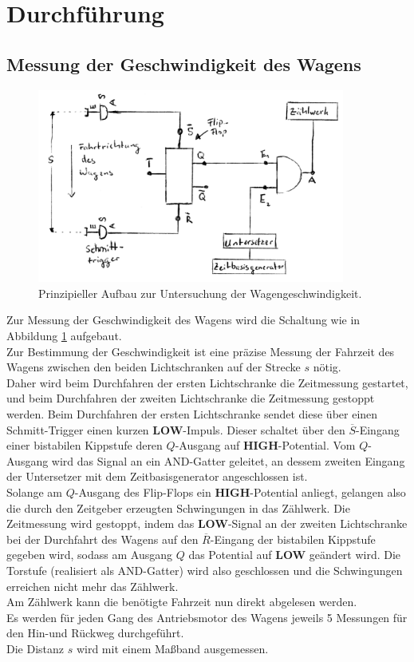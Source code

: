 \section{Durchführung}
\FloatBarrier
\label{sec:Durchführung}
\subsection{Messung der Geschwindigkeit des Wagens}
\label{sec:speedygonzales}
\begin{figure}
	\includegraphics[width=0.9\textwidth]{Bilder/geschwindigkeit_schaltung.png}
	\caption{Prinzipieller Aufbau zur Untersuchung der Wagengeschwindigkeit.}
	\label{fig:wagen} %
\end{figure}
Zur Messung der Geschwindigkeit des Wagens wird die Schaltung wie in Abbildung \ref{fig:wagen} aufgebaut.\\
Zur Bestimmung der Geschwindigkeit ist eine präzise Messung der Fahrzeit des Wagens zwischen den beiden Lichtschranken auf der Strecke $s$ nötig.\\
Daher wird beim Durchfahren der ersten Lichtschranke die Zeitmessung gestartet, und beim Durchfahren der zweiten Lichtschranke die Zeitmessung gestoppt werden.
Beim Durchfahren der ersten Lichtschranke sendet diese über einen Schmitt-Trigger einen kurzen \textbf{LOW}-Impuls. Dieser schaltet über den $\overline{S}$-Eingang einer bistabilen Kippstufe deren $Q$-Ausgang auf \textbf{HIGH}-Potential.
Vom $Q$-Ausgang wird das Signal an ein AND-Gatter geleitet,
an dessem zweiten Eingang der Untersetzer mit dem Zeitbasisgenerator angeschlossen ist. \\
Solange am $Q$-Ausgang des Flip-Flops ein \textbf{HIGH}-Potential anliegt, gelangen also die durch den Zeitgeber erzeugten Schwingungen in das Zählwerk.
Die Zeitmessung wird gestoppt, indem das \textbf{LOW}-Signal an der zweiten Lichtschranke  bei der Durchfahrt des Wagens auf den $\overline{R}$-Eingang der bistabilen Kippstufe gegeben wird,
sodass am Ausgang $Q$ das Potential auf \textbf{LOW} geändert wird. Die Torstufe (realisiert als AND-Gatter) wird also geschlossen und die Schwingungen erreichen nicht mehr das Zählwerk.\\
Am Zählwerk kann die benötigte Fahrzeit nun direkt abgelesen werden.\\
Es werden für jeden Gang des Antriebsmotor des Wagens jeweils 5 Messungen für den Hin-und Rückweg durchgeführt. \\
Die Distanz $s$ wird mit einem Maßband ausgemessen.


